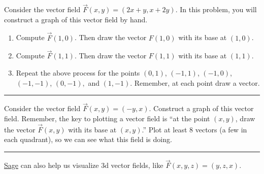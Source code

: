 \begin{problem}%
%
 Consider the vector field $\vec F(x,y)=(2x+y,x+2y)$.  In this problem, you will construct a graph of this vector field by hand.
\begin{enumerate}
 \item Compute $\vec F(1,0)$. Then draw the vector $F(1,0)$ with its base at $(1,0)$.
 \item Compute $\vec F(1,1)$. Then draw the vector $F(1,1)$ with its base at $(1,1)$.
 \item Repeat the above process for the points $(0,1)$, $(-1,1)$, $(-1,0)$, $(-1,-1)$, $(0,-1),$ and $(1,-1)$. Remember, at each point draw a vector.  
\end{enumerate}
\hrule\end{problem}


\begin{problem}%
 Consider the vector field $\vec F(x,y)=(-y,x)$. Construct a graph of this vector field. Remember, the key to plotting a vector field is ``at the point $(x,y)$, draw the vector $\vec F(x,y)$ with its base at $(x,y)$.''  Plot at least 8 vectors (a few in each quadrant), so we can see what this field is doing.
\hrule\end{problem}


\href{http://aleph.sagemath.org/?z=eJxz06jQqdSp0lSwVdAA0joVmlwFOfkl8WWpySX5RfFpmak5KcYpGm46CkCFusY6xpo6IIUQlkYVhKEJAOGFExs}{Sage} can also help us visualize 3d vector fields, like $\vec F(x,y,z)=(y,z,x)$. 

